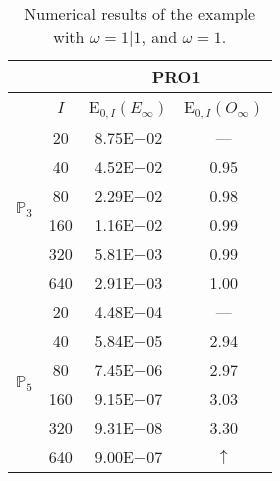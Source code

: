 \begin{table}[H]
\caption{Numerical results of the example with $\omega=1|1$, and $\omega=1$.}
\setlength{\tabcolsep}{5pt}
\centering
\begin{tabular}{@{}l c c c@{}}
\toprule
 &  & \multicolumn{2}{c}{PRO1}\\
\midrule
 & $I$ & E$_{0,I}(E_{\infty})$ & E$_{0,I}(O_{\infty})$\\
\midrule
\multirow{6}{*}{$\mathbb{P}_{3}$}
 & 20 & 8.75E$-$02 & ---\\
 & 40 & 4.52E$-$02 & 0.95\\
 & 80 & 2.29E$-$02 & 0.98\\
 & 160 & 1.16E$-$02 & 0.99\\
 & 320 & 5.81E$-$03 & 0.99\\
 & 640 & 2.91E$-$03 & 1.00\\
\midrule
\multirow{6}{*}{$\mathbb{P}_{5}$}
 & 20 & 4.48E$-$04 & ---\\
 & 40 & 5.84E$-$05 & 2.94\\
 & 80 & 7.45E$-$06 & 2.97\\
 & 160 & 9.15E$-$07 & 3.03\\
 & 320 & 9.31E$-$08 & 3.30\\
 & 640 & 9.00E$-$07 & $\uparrow$\\
\bottomrule
\end{tabular}
\label{Table:PRO:test_01_01_test43_pro1}
\end{table}
